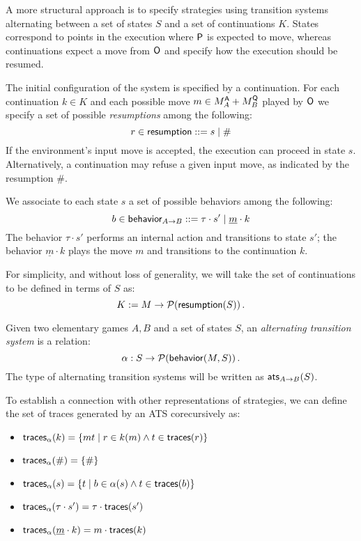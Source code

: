 A more structural approach is to specify
strategies using transition systems
alternating between a set of states $S$ and
a set of continuations $K$.
States correspond to points in the execution
where $ \mathsf{P} $ is expected to move,
whereas continuations expect a move from $ \mathsf{O} $
and specify how the execution should be resumed.

The initial configuration of the system
is specified by a continuation.
For each continuation $k \in K$
and each possible move $m \in M_A^{ \mathsf{A} } + M_B^{ \mathsf{Q} }$ played by $ \mathsf{O} $
we specify a set of possible \emph{resumptions}
among the following:
\[ r \in  \mathsf{resumption}  ::= s \mid \# \]
If the environment's input move is accepted,
the execution can proceed in state $s$.
Alternatively,
a continuation may refuse a given input move,
as indicated by the resumption $\#$.

We associate to each state $s$ a set of possible
behaviors among the following:
\[ b \in  \mathsf{behavior} _{A \rightarrow B} ::=
	\tau \cdot s' \mid
	\underline{m} \cdot k \]
The behavior $\tau \cdot s'$
performs an internal action and transitions to state $s'$;
the behavior $\underline{m} \cdot k$
plays the move $m$ and transitions to the continuation $k$.

For simplicity, and without loss of generality,
we will take the set of continuations
to be defined in terms of $S$ as:
\[ K := M \rightarrow \mathcal{P}( \mathsf{resumption} (S)) \,. \]

\begin{definition}
Given two elementary games $A, B$ and a set of states $S$,
an \emph{alternating transition system} is a relation:
\[
  \alpha : S \rightarrow \mathcal{P}( \mathsf{behavior} (M, S)) \,.
\]
The type of alternating transition systems
will be written as $ \mathsf{ats} _{A \rightarrow B}(S)$.
\end{definition}

To establish a connection with other representations of strategies,
we can define the set of traces generated by an ATS
corecursively as:
\begin{itemize}
  \item $ \mathsf{traces} _\alpha(k) =
         \{ mt \mid r \in k(m) \wedge t \in  \mathsf{traces} (r) \}$
  \item $ \mathsf{traces} _\alpha(\#) = \{ \# \}$
  \item $ \mathsf{traces} _\alpha(s) =
         \{ t \mid b \in \alpha(s) \wedge t \in  \mathsf{traces} (b) \}$
  \item $ \mathsf{traces} _\alpha(\tau \cdot s') =
         \tau \cdot  \mathsf{traces} (s')$
  \item $ \mathsf{traces} _\alpha(\underline{m} \cdot k) =
         m \cdot  \mathsf{traces} (k)$
\end{itemize}

